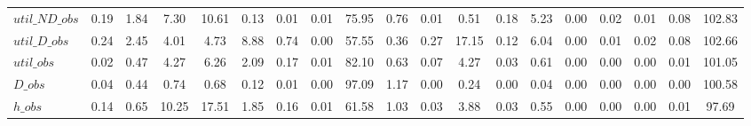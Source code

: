 \begin{center}
\begin{longtable}{lcccccccccccccccccc}
$util\_ND\_obs  $	 & 	                0.19	 & 	                1.84	 & 	                7.30	 & 	               10.61	 & 	                0.13	 & 	                0.01	 & 	                0.01	 & 	               75.95	 & 	                0.76	 & 	                0.01	 & 	                0.51	 & 	                0.18	 & 	                5.23	 & 	                0.00	 & 	                0.02	 & 	                0.01	 & 	                0.08	 & 	              102.83 \\ 
$util\_D\_obs   $	 & 	                0.24	 & 	                2.45	 & 	                4.01	 & 	                4.73	 & 	                8.88	 & 	                0.74	 & 	                0.00	 & 	               57.55	 & 	                0.36	 & 	                0.27	 & 	               17.15	 & 	                0.12	 & 	                6.04	 & 	                0.00	 & 	                0.01	 & 	                0.02	 & 	                0.08	 & 	              102.66 \\ 
$util\_obs      $	 & 	                0.02	 & 	                0.47	 & 	                4.27	 & 	                6.26	 & 	                2.09	 & 	                0.17	 & 	                0.01	 & 	               82.10	 & 	                0.63	 & 	                0.07	 & 	                4.27	 & 	                0.03	 & 	                0.61	 & 	                0.00	 & 	                0.00	 & 	                0.00	 & 	                0.01	 & 	              101.05 \\ 
$D\_obs         $	 & 	                0.04	 & 	                0.44	 & 	                0.74	 & 	                0.68	 & 	                0.12	 & 	                0.01	 & 	                0.00	 & 	               97.09	 & 	                1.17	 & 	                0.00	 & 	                0.24	 & 	                0.00	 & 	                0.04	 & 	                0.00	 & 	                0.00	 & 	                0.00	 & 	                0.00	 & 	              100.58 \\ 
$h\_obs         $	 & 	                0.14	 & 	                0.65	 & 	               10.25	 & 	               17.51	 & 	                1.85	 & 	                0.16	 & 	                0.01	 & 	               61.58	 & 	                1.03	 & 	                0.03	 & 	                3.88	 & 	                0.03	 & 	                0.55	 & 	                0.00	 & 	                0.00	 & 	                0.00	 & 	                0.01	 & 	               97.69 \\ 
\end{longtable}
 \end{center}
